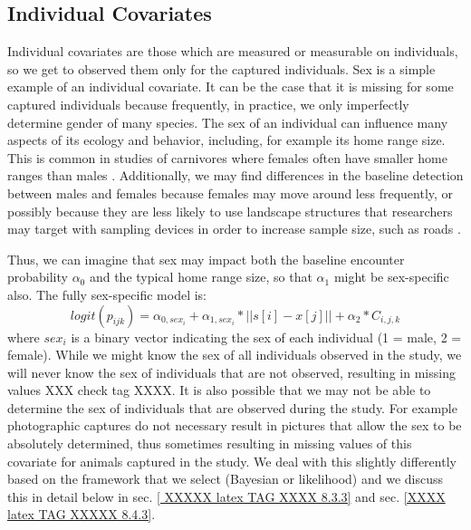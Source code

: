 \subsection{Individual Covariates}

Individual covariates are those which are measured or measurable on
individuals, so we get to observed them only for the captured
individuals. Sex is a simple example of an individual covariate. It can be the
case that it is missing for some captured individuals because
frequently, in practice, we only imperfectly determine gender of many
species.  The sex of an individual can influence many aspects of its ecology and behavior, including, for example its home range size. This is
common in studies of carnivores where females often have smaller home ranges than
males \citep{gardner_etal:2010jwm, sollmann_etal:2011}. Additionally, we may find differences in
the baseline detection between males and females because females may move around less frequently, or possibly because they are less likely to use landscape structures that researchers may target with sampling devices in order to increase sample size, such as roads \citep[e.g.]{salom-perez_etal:2007}. 


Thus, we can imagine that sex may impact both the baseline encounter
probability $\alpha_{0}$ and the typical home range
size, so that
$\alpha_{1}$ might be sex-specific also.  The fully sex-specific model is:
\[
logit(p_{ijk}) = \alpha_{0,sex_{i}} + \alpha_{1, sex_{i}}*||s[i]-x[j]|| + \alpha_2*C_{i,j,k}
\]
where $sex_{i}$ is a binary vector indicating the sex of
each individual (1 = male, 2 = female).  While we might know the sex of all
individuals observed in the study, we will never know the
sex of individuals that are not observed,
resulting in missing values \citep{gardner_etal:2010jwm} XXX check tag XXXX.
It is also possible that we may not be able to determine the sex of
individuals that are observed during the study. For example photographic
captures do not necessary result in pictures that allow the sex to be absolutely
determined, thus sometimes resulting in missing values of this covariate for animals
captured in the study.   We deal with this slightly differently based on the framework
that we select (Bayesian or likelihood) and we discuss this in detail
below in sec. \ref{ XXXXX latex TAG XXXX 8.3.3} and sec. \ref{XXXX latex TAG XXXXX 8.4.3}.

\begin{comment}
XXX whole section on this below so commented out here XXXXX
\subsection{Heterogeneity}

Heterogeneity is a covariate that is completely latent.  This can
include many things such as an additive individual effect or an
individual-specific effect of distance.  We address these models
separately in Section 8.5 below and show a simple example of a finite
mixture model carried out in secr in Section 8.4.4.
\end{comment}

